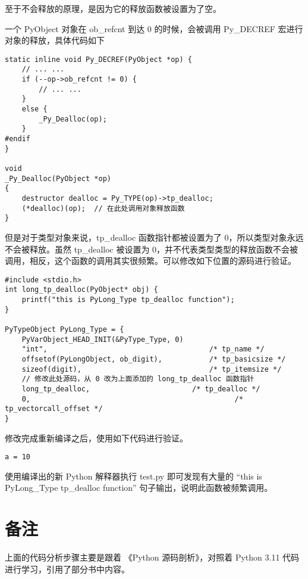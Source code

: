 \documentclass[12pt]{article}
\begin{document}
至于不会释放的原理，是因为它的释放函数被设置为了空。

一个 PyObject 对象在 ob\_refcnt 到达 0 的时候，会被调用 Py\_DECREF 宏进行对象的释放，具体代码如下

\begin{lstlisting}[caption={PyObject 释放过程}]
static inline void Py_DECREF(PyObject *op) {
    // ... ...
    if (--op->ob_refcnt != 0) {
	    // ... ...
    }
    else {
        _Py_Dealloc(op);
    }
#endif
}

void
_Py_Dealloc(PyObject *op)
{
    destructor dealloc = Py_TYPE(op)->tp_dealloc;
    (*dealloc)(op);  // 在此处调用对象释放函数
}
\end{lstlisting}

但是对于类型对象来说，tp\_dealloc 函数指针都被设置为了 0，所以类型对象永远不会被释放。虽然 tp\_dealloc 被设置为 0，并不代表类型类型的释放函数不会被调用，相反，这个函数的调用其实很频繁。可以修改如下位置的源码进行验证。

\begin{lstlisting}[caption={修改 PyLong\_Type 源码}]
#include <stdio.h>
int long_tp_dealloc(PyObject* obj) {
    printf("this is PyLong_Type tp_dealloc function");
}

PyTypeObject PyLong_Type = {
    PyVarObject_HEAD_INIT(&PyType_Type, 0)
    "int",                                      /* tp_name */
    offsetof(PyLongObject, ob_digit),           /* tp_basicsize */
    sizeof(digit),                              /* tp_itemsize */
    // 修改此处源码，从 0 改为上面添加的 long_tp_dealloc 函数指针
    long_tp_dealloc,                        /* tp_dealloc */
    0,                                                /* tp_vectorcall_offset */
}
\end{lstlisting}

修改完成重新编译之后，使用如下代码进行验证。

\begin{lstlisting}[caption={test.py}]
a = 10
\end{lstlisting}


使用编译出的新 Python 解释器执行 test.py 即可发现有大量的 “this is PyLong\_Type tp\_dealloc function” 句子输出，说明此函数被频繁调用。


\newpage
\section*{备注}

上面的代码分析步骤主要是跟着 《Python 源码剖析》，对照着 Python 3.11 代码进行学习，引用了部分书中内容。
\end{document}
